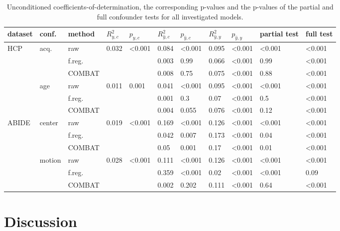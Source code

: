 \documentclass{article}
\begin{document}
\renewcommand{\arraystretch}{1.2}
\begin{table}
\centering
\begin{tabular}{lll|ll|ll|ll|ll} 
dataset & conf. & method & $R^2_{y, c}$ & $p_{y, c}$ & $R^2_{\hat{y}, c}$ & $p_{\hat{y}, c}$ & $R^2_{\hat{y}, y}$ & $p_{\hat{y}, y}$ & partial test & full test  \\
\hline
HCP & acq.  & raw      & 0.032 & <0.001 & 0.084 & <0.001  & 0.095 & <0.001 & <0.001 & <0.001 \\
    &              & f.reg.    & & &0.003 & 0.99 & 0.066  & <0.001  & 0.99 & <0.001 \\
    &              & COMBAT    & & &0.008 & 0.75 & 0.075  & <0.001  & 0.88 & <0.001\\
\hline
    & age   & raw       & 0.011 & 0.001  & 0.041 & <0.001  & 0.095  & <0.001 & <0.001 & <0.001 \\
    &       & f.reg.    & & &0.001 & 0.3 & 0.07  & <0.001  & 0.5 & <0.001 \\
    &       & COMBAT    & & &0.004 & 0.055 & 0.076 & <0.001 & 0.12 & <0.001 \\
\hline
ABIDE   & center   & raw       & 0.019  & <0.001 &  0.169 & <0.001& 0.126     & <0.001 & <0.001 & <0.001 \\
        &          & f.reg.    &  & &  0.042 & 0.007 & 0.173     & <0.001 & 0.04 & <0.001 \\
        &          & COMBAT    &  & &  0.05 & 0.001 & 0.17     & <0.001 & 0.01 & <0.001 \\
\hline
        & motion   & raw       & 0.028 & <0.001 & 0.111    &  <0.001 & 0.126    & <0.001 & <0.001& <0.001 \\
        &          & f.reg.    & & & 0.359    & <0.001  & 0.02   & <0.001 & <0.001 & 0.09 \\
        &          & COMBAT    & & &  0.002 & 0.202 & 0.111     & <0.001 & 0.64 & <0.001 \\
    

\end{tabular}
\caption{\label{tab:unconditional-pvals} Unconditioned coefficients-of-determination, the corresponding p-values and the p-values of the partial and full confounder tests for all investigated models.}
\end{table}

\section{Discussion}
\end{document}
